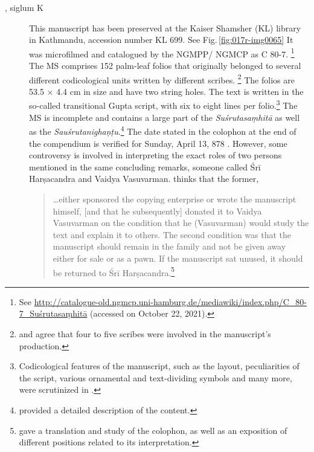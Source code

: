 \begin{description}
    
    \item[, siglum K] 
    This manuscript has been preserved at the
    Kaiser Shamsher (KL) library in Kathmandu, accession number KL 699.  
    See Fig.\,\ref{fig:017r-img0065} It was
    microfilmed and catalogued by the NGMPP/ NGMCP as C 80-7.%
    \footnote{%
    See 
    \url{http://catalogue-old.ngmcp.uni-hamburg.de/mediawiki/index.php/C_80-7_Suśrutasaṃhitā}
    (accessed on October 22, 2021).%
    } The MS comprises 152 palm-leaf folios that originally belonged to several
    different codicological units written by different scribes.%
    \footnote{%
    \textcites[46]{bhat-2020} and \textcites[11]{kleb-2021b} agree that four to
    five scribes were involved in the manuscript's production. } The folios are
    53.5 $\times$ 4.4 cm in size and have two string holes.  The text is written
    in the so-called transitional Gupta script, with six to eight lines per
    folio.\footnote{Codicological features of the manuscript, such as the layout,
    peculiarities of the script, various ornamental and text-dividing symbols and
    many more, were scrutinized in \textcites{bhat-2020}.} The MS is incomplete
    and contains a large part of the \emph{Suśrutasaṃhitā} as well as the
    \emph{Sauśrutanighaṇṭu}.\footnote{\textcite[11]{kleb-2021b} provided a
    detailed description of the content.} The date stated in the colophon at the
    end of the compendium is verified for Sunday, April 13, 878 \CE. However, some
    controversy is involved in interpreting the exact roles of two persons
    mentioned in the same concluding remarks, someone called Śrī Harṣacandra and
    Vaidya Vasuvarman. \textcites[16]{kleb-2021b} thinks that the former,
    \begin{quote}
        \ldots either sponsored the copying enterprise or wrote the manuscript himself,
        [and that he subsequently] donated it to Vaidya Vasuvarman on the condition that
        he (Vasuvarman) would study the text and explain it to others. The second
        condition was that the manuscript should remain in the family and not be given
        away either for sale or as a pawn. If the manuscript sat unused, it should be
        returned to Śrī Harṣacandra.\footnote{\textcite[13--17]{kleb-2021b} gave a
        translation and study of the colophon, as well as an exposition of different
        positions related to its interpretation.}
    \end{quote}
    

\end{description}
